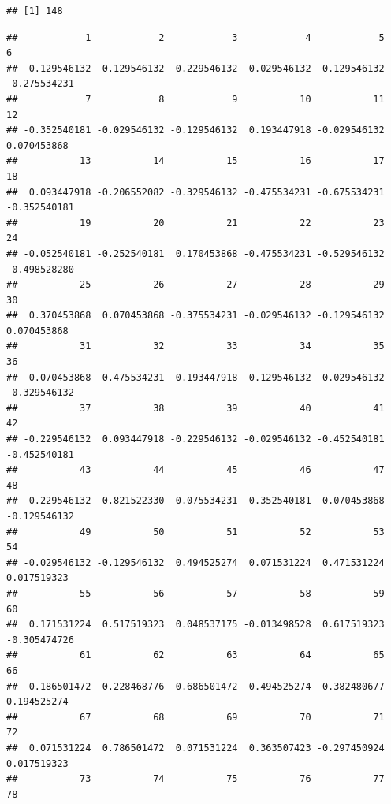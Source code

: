 \documentclass[
]{book}
\newenvironment{Shaded}{\begin{snugshade}}{\end{snugshade}}
\newcommand{\NormalTok}[1]{#1}
\newcommand{\SpecialCharTok}[1]{\textcolor[rgb]{0.81,0.36,0.00}{\textbf{#1}}}
\begin{document}
\begin{verbatim}
## [1] 148
\end{verbatim}

\begin{Shaded}
\end{Shaded}

\begin{verbatim}
##            1            2            3            4            5            6 
## -0.129546132 -0.129546132 -0.229546132 -0.029546132 -0.129546132 -0.275534231 
##            7            8            9           10           11           12 
## -0.352540181 -0.029546132 -0.129546132  0.193447918 -0.029546132  0.070453868 
##           13           14           15           16           17           18 
##  0.093447918 -0.206552082 -0.329546132 -0.475534231 -0.675534231 -0.352540181 
##           19           20           21           22           23           24 
## -0.052540181 -0.252540181  0.170453868 -0.475534231 -0.529546132 -0.498528280 
##           25           26           27           28           29           30 
##  0.370453868  0.070453868 -0.375534231 -0.029546132 -0.129546132  0.070453868 
##           31           32           33           34           35           36 
##  0.070453868 -0.475534231  0.193447918 -0.129546132 -0.029546132 -0.329546132 
##           37           38           39           40           41           42 
## -0.229546132  0.093447918 -0.229546132 -0.029546132 -0.452540181 -0.452540181 
##           43           44           45           46           47           48 
## -0.229546132 -0.821522330 -0.075534231 -0.352540181  0.070453868 -0.129546132 
##           49           50           51           52           53           54 
## -0.029546132 -0.129546132  0.494525274  0.071531224  0.471531224  0.017519323 
##           55           56           57           58           59           60 
##  0.171531224  0.517519323  0.048537175 -0.013498528  0.617519323 -0.305474726 
##           61           62           63           64           65           66 
##  0.186501472 -0.228468776  0.686501472  0.494525274 -0.382480677  0.194525274 
##           67           68           69           70           71           72 
##  0.071531224  0.786501472  0.071531224  0.363507423 -0.297450924  0.017519323 
##           73           74           75           76           77           78 

\end{verbatim}
\end{document}
